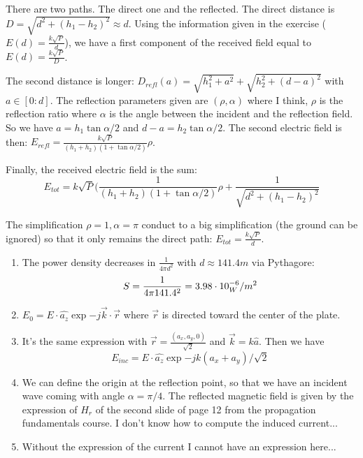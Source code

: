 
\begin{solution}
	There are two paths. The direct one and the reflected. The direct distance is $D = \sqrt{d^2 + (h_1 - h_2)^2} \approx d$. Using the information given in the exercise ($E(d) = \frac{k\sqrt{P}}{d}$), we have a first component of the received field equal to $E(d) = \frac{k\sqrt{P}}{D}$.

	
	The second distance is longer: $D_{refl}(a) = \sqrt{h_1^2 + a^2} + \sqrt{h_2^2 + (d - a)^2}$ with $a \in [0:d]$. 	
	The reflection parameters given are $(\rho, \alpha)$ where I think, $\rho$ is the reflection ratio where $\alpha$ is the angle between the incident and the reflection field. So we have $a = h_1 \tan{\alpha/2}$ and $d - a = h_2 \tan{\alpha/2}$. 
	The second electric field is then: $E_{refl} = \frac{k\sqrt{P}}{(h_1 + h_2)(1 + \tan{\alpha/2})}\rho$.
	
	
	Finally, the received electric field is the sum:
	$$E_{tot} = k\sqrt{P} (\frac{1}{(h_1 + h_2)(1 + \tan{\alpha/2})}\rho + \frac{1}{\sqrt{d^2 + (h_1 - h_2)^2}}$$

	
	The simplification $\rho = 1, \alpha = \pi$ conduct to a big simplification (the ground can be ignored) so that it only remains the direct path: $E_{tot} = \frac{k\sqrt{P}}{d}$.
\end{solution}

\begin{solution}
	\begin{enumerate}
		\item The power density decreases in $\frac{1}{4\pi d^2}$ with $d \approx 141.4m$ via Pythagore:
			  $$ S = \frac{1}{4\pi 141.4^2} = 3.98\cdot 10^{-6}_W/m^2 $$
		\item $E_0 = E \cdot \hat{a_z} \exp{-j\vec{k} \cdot \vec{r}}$ where $\vec{r}$ is directed toward the center of the plate.
		\item It's the same expression with $\vec{r} = \frac{(a_x, a_y, 0)}{\sqrt{2}}$ and $\vec{k} = k \hat{a}$. Then we have 
			  $$E_{inc} = E \cdot \hat{a_z} \exp{-j k (a_x + a_y)/\sqrt{2}}$$ 

			  \notsure
			  
		\item We can define the origin at the reflection point, so that we have an incident wave coming with angle $\alpha = \pi/4$. The reflected magnetic field is given by the expression of $H_r$ of the second slide of page 12 from the propagation fundamentals course.
			  \notsure I don't know how to compute the induced current...
		\item Without the expression of the current I cannot have an expression here... \notsure
	\end{enumerate}
\end{solution}
\nosolution
\nosolution
\nosolution
\nosolution
